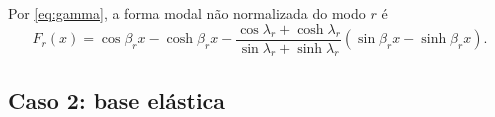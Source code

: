 Por \eqref{eq:gamma}, a forma modal não normalizada do modo $r$ é
\begin{equation}
    F_r(x) = \cos\beta_r x - \cosh\beta_r x
    - \frac{\cos\lambda_r + \cosh\lambda_r}{\sin\lambda_r + \sinh\lambda_r}
    \left(\sin\beta_r x - \sinh\beta_r x\right).
    \label{eq:F_engaste}
\end{equation}



\subsection{Caso 2: base elástica}
\label{sec:molas}

